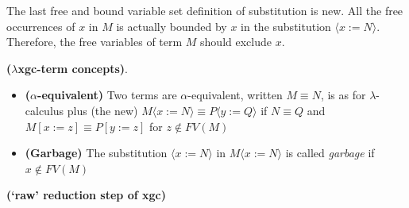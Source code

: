 The last free and bound variable set definition of substitution is new. All the free occurrences of $x$ in $M$ is actually bounded by $x$ in the substitution $\langle x:=N\rangle$. Therefore, the free variables of term $M$ should exclude $x$. 

\begin{def1}
\normalfont \textbf{($\lambda$xgc-term concepts)}. 
\end{def1}

\begin{itemize}
\item \textbf{($\alpha$-equivalent)} Two terms are $\alpha$-equivalent, written $M\equiv N$, is as for $\lambda$-calculus plus (the new) $M\langle x:=N\rangle \equiv P\langle y:=Q\rangle$ if $N \equiv Q$ and $M[x:=z]\equiv P[y:=z]$ for $z \notin FV(M)$
\item \textbf{(Garbage)} The substitution $\langle x:=N\rangle$ in $M\langle x:=N\rangle$ is called \textit{garbage} if $x \notin FV(M)$
\end{itemize}



\begin{def1}
\normalfont \textbf{(`raw' reduction step of xgc)}
\end{def1}

